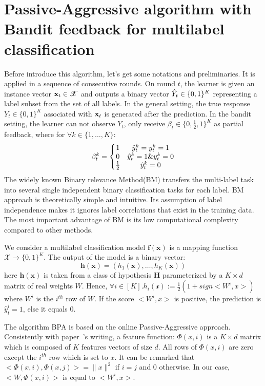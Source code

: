 \section{Passive-Aggressive algorithm with Bandit feedback for multilabel classification}
\label{sec:BPAS}
Before introduce this algorithm, let's get some notations and preliminaries. It is applied in a sequence of consecutive rounds. On round $t$, the learner is given an instance vector $\mathbf{x}_t\in\mathscr{X}$ and outputs a binary vector $\hat{Y}_t\in \{0,1\}^K$ representing a label subset from the set of all labels. In the general setting, the true response $Y_t\in\{0,1\}^K$ associated with $\mathbf{x}_t$ is generated after the prediction. In the bandit setting, the learner can not observe $Y_t$, only receive $\beta_t\in\{0,\frac{1}{2},1\}^K$ as partial feedback, where for $\forall k\in\{1,\dots,K\}$:
\begin{equation}
\beta_t^k = \left\{\begin{matrix}
1 			& \hat{y}_t^k = y_t^k = 1 \\
0 			& \hat{y}_t^k = 1 \& y_t^k = 0 \\
\frac{1}{2} & \hat{y}_t^k = 0
\end{matrix}
\right.
\end{equation}
The widely known Binary relevance Method(BM) \cite{read2008pruned} transfers the multi-label task into  several single independent binary classification tasks for each label. BM approach is theoretically simple and intuitive. Its assumption of label independence makes it ignores label correlations that exist in the training data. The most important advantage of BM is its low computational complexity compared to other methods.

We consider a multilabel classification model $\mathbf{f(x)}$ is a mapping function $\mathscr{X}\rightarrow \{0,1\}^K$. The output of the model is a binary vector:
\[\mathbf{h(x)} = (h_1(\mathbf{x}),\dots,h_K(\mathbf{x}))\]
here $\mathbf{h(x)}$ is taken from a class of hypothesis $\mathbf{H}$ parameterized by a $K\times d$ matrix of real weights $W$. Hence, $\forall i\in [K]. h_i(\mathscr{x}):= \frac{1}{2}(1+sign<W^i,x>)$ where $W^i$ is the $i^{th}$ row of $W$. If the score $<W^i,x>$ is positive, the prediction is $\hat{y}_t^i = 1$, else it equals $0$.

The algorithm BPA is based on the online Passive-Aggressive approach. Consistently with paper~\cite{crammer2006online}'s writing, a feature function: $\Phi(x,i)$ is a $K\times d$ matrix which is composed of $K$ features vectors of size $d$. All rows of $\Phi(x,i)$ are zero except the $i^{th}$ row which is set to $x$. It can be remarked that $<\Phi(x,i),\Phi(x,j)> = \parallel{x}\parallel^2$ if $i=j$ and $0$ otherwise. In our case, $<W,\Phi(x,i)>$ is equal to $<W^i,x>$.

